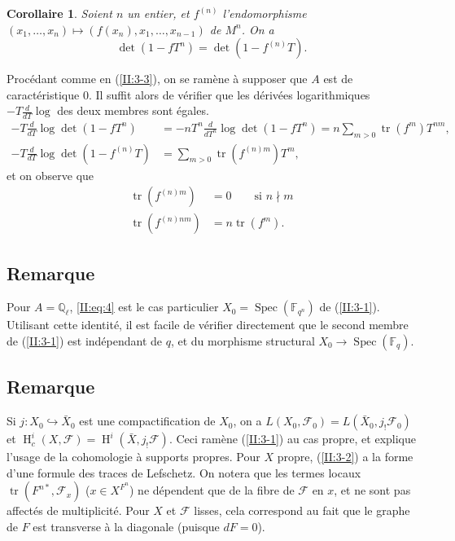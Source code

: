 \documentclass{book}
\DeclareMathOperator{\h}{H}
\DeclareMathOperator{\spec}{Spec}
\DeclareMathOperator{\tr}{tr}
\newcommand{\cF}{\mathcal{F}}
\newcommand{\dF}{\mathbb{F}}
\newcommand{\dQ}{\mathbb{Q}}
\newtheorem{corollary_}[subsection]{Corollaire}
\begin{document}
\begin{corollary_}\label{II:3-4}
Soient $n$ un entier, et $f^{(n)}$ l'endomorphisme 
$(x_1,\dotsc,x_n)\mapsto \left(f(x_n),x_1,\dotsc,x_{n-1}\right)$ de $M^n$. 
On a 
\begin{equation}\label{II:eq:4}
  \det(1-f T^n) = \det(1-f^{(n)} T) \text{.}
\end{equation}
\end{corollary_}

Procédant comme en (\ref{II:3-3}), on se ramène à supposer que $A$ est de 
caractéristique $0$. Il suffit alors de vérifier que les dérivées 
logarithmiques $-T\frac{d}{dT}\log$ des deux membres sont égales. 
\begin{align*}
  -T\frac{d}{dT}\log\det(1-f T^n) &= - n T^n \frac{d}{dT^n} \log\det(1-f T^n) = n \sum_{m>0} \tr(f^m) T^{n m} \text{,} \\
  -T \frac{d}{dT}\log\det\left(1-f^{(n)} T\right) &= \sum_{m>0} \tr\left(f^{(n) m}\right) T^m \text{,}
\end{align*}
et on observe que 
\begin{align*}
  \tr(f^{(n) m}) &= 0 \qquad \text{si $n\nmid m$} \\
  \tr(f^{(n) n m}) &= n \tr(f^m) \text{.}
\end{align*}





\subsection{Remarque}\label{II:3-5}

Pour $A=\dQ_\ell$, \eqref{II:eq:4} est le cas particulier 
$X_0=\spec(\dF_{q^n})$ de (\ref{II:3-1}). Utilisant cette identité, il est 
facile de vérifier directement que le second membre de (\ref{II:3-1}) est 
indépendant de $q$, et du morphisme structural $X_0\to\spec(\dF_q)$. 





\subsection{Remarque}\label{II:3-6}

Si $j:X_0\hookrightarrow \bar X_0$ est une compactification de $X_0$, on a 
$L(X_0,\cF_0) = L(\bar X_0, j_!\cF_0)$ et 
$\h_c^i(X,\cF) = \h^i(\bar X,j_!\cF)$. Ceci ramène (\ref{II:3-1}) au cas 
propre, et explique l'usage de la cohomologie à supports propres. Pour $X$ 
propre, (\ref{II:3-2}) a la forme d'une formule des traces de Lefschetz. On 
notera que les termes locaux $\tr(F^{n *},\cF_x)$ ($x\in X^{F^n}$) ne 
dépendent que de la fibre de $\cF$ en $x$, et ne sont pas affectés de 
multiplicité. Pour $X$ et $\cF$ lisses, cela correspond au fait que le graphe 
de $F$ est transverse à la diagonale (puisque $d F = 0$). 
\end{document}
